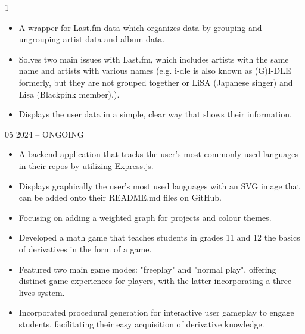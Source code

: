 \documentclass[10pt,a4paper,ragged2e,withhyper]{altacv}
\begin{document}
\begin{paracol}{1}
  \begin{itemize}
    \item{A wrapper for Last.fm data which organizes data by grouping and ungrouping artist data and album data.}
    \item {Solves two main issues with Last.fm, which includes artists with the same name and artists with various names (e.g. i-dle is also known as (G)I-DLE formerly, but they are not grouped together or LiSA (Japanese singer) and Lisa (Blackpink member).).}
    \item {Displays the user data in a simple, clear way that shows their information.}
  \end{itemize}
  \divider

  {05 2024 -- ONGOING}{}
  \begin{itemize}
    \item{A backend application that tracks the user's most commonly used languages in their repos by utilizing Express.js.}
    \item{Displays graphically the user's most used languages with an SVG image that can be added onto their README.md files on GitHub.}
    \item{Focusing on adding a weighted graph for projects and colour themes.}
  \end{itemize}
  \divider

  \begin{itemize}
    \item{Developed a math game that teaches students in grades 11 and 12 the basics of derivatives in the form of a game.}
    \item{Featured two main game modes: "freeplay" and "normal play", offering distinct game experiences for players, with the latter incorporating a three-lives system.}
    \item{Incorporated procedural generation for interactive user gameplay to engage students, facilitating their easy acquisition of derivative knowledge.}
  \end{itemize}

  \begin{sloppypar}
  \end{sloppypar}


\end{paracol}
\end{document}
